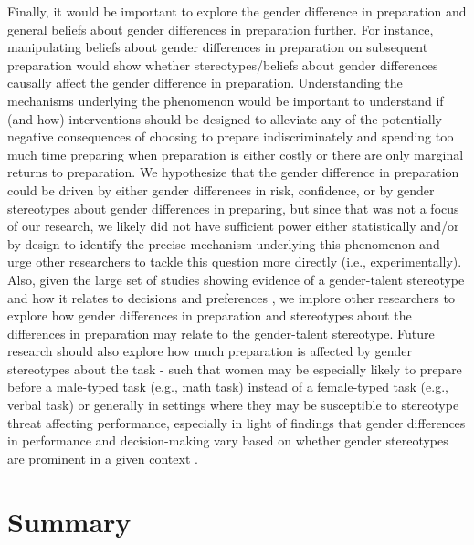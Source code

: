 \documentclass[a4paper, nobind]{templates/ociamthesis}
\begin{document}
Finally, it would be important to explore the gender difference in preparation and general beliefs about gender differences in preparation further. For instance, manipulating beliefs about gender differences in preparation on subsequent preparation would show whether stereotypes/beliefs about gender differences causally affect the gender difference in preparation. Understanding the mechanisms underlying the phenomenon would be important to understand if (and how) interventions should be designed to alleviate any of the potentially negative consequences of choosing to prepare indiscriminately and spending too much time preparing when preparation is either costly or there are only marginal returns to preparation. We hypothesize that the gender difference in preparation could be driven by either gender differences in risk, confidence, or by gender stereotypes about gender differences in preparing, but since that was not a focus of our research, we likely did not have sufficient power either statistically and/or by design to identify the precise mechanism underlying this phenomenon and urge other researchers to tackle this question more directly (i.e., experimentally). Also, given the large set of studies showing evidence of a gender-talent stereotype and how it relates to decisions and preferences \autocite{Napp2022,Bian2017,Bian2017a,Leslie2015,Meyer2015,Bian2018,Storage2020}, we implore other researchers to explore how gender differences in preparation and stereotypes about the differences in preparation may relate to the gender-talent stereotype. Future research should also explore how much preparation is affected by gender stereotypes about the task - such that women may be especially likely to prepare before a male-typed task (e.g., math task) instead of a female-typed task (e.g., verbal task) or generally in settings where they may be susceptible to stereotype threat affecting performance, especially in light of findings that gender differences in performance and decision-making vary based on whether gender stereotypes are prominent in a given context \autocite{Gneezy2003,Shurchkov2012,Apicella2015,Niederle2011}.

\hypertarget{summary-4}{%
\section{Summary}\label{summary-4}}
\end{document}
